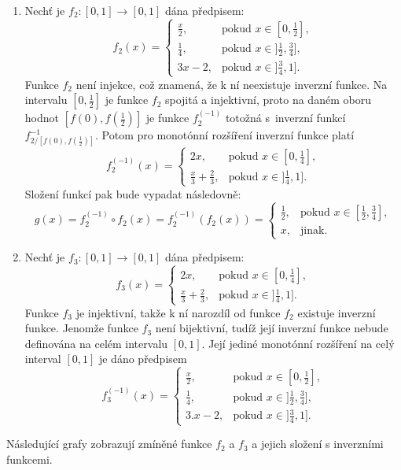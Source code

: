 \begin{example}
\label{sec: funkce}
\cite{hlinena}
\begin{enumerate}
    \item Nech\v t je $f_2:[0,1] \rightarrow [0,1]$ dána předpisem:
    $$f_2(x)= \begin{cases} \frac x2, & \mbox{pokud~} x \in [0,\frac 12],
    \\ \frac 14, & \mbox{pokud~} x \in ]\frac 12,\frac 34],
    \\ 3x-2, & \mbox{pokud~} x \in ]\frac 34,1].
    \end{cases}$$
    Funkce $f_2$ není injekce, což znamená, že k ní neexistuje inverzní funkce. Na intervalu $[0,\frac 12]$ je funkce $f_2$ spojitá a injektivní, proto na daném oboru hodnot $[f(0),f(\frac 12)]$ je
    funkce $f_2^{(-1)}$ totožná s~inverzní funkcí
    $f_{2/[f(0),f(\frac 12)]}^{-1}.$
    Potom pro monot\'onní rozšíření inverzní funkce plat\'i
    $$f_2^{(-1)}(x)= \begin{cases} 2x, & \mbox {pokud $x \in [0,\frac 14],$}
    \\ \frac x3 + \frac 23, & \mbox {pokud $x \in ]\frac 14,1].$}
    \end{cases}$$
    Složení funkcí pak bude vypadat následovně:
    $$g(x)=f_2^{(-1)} \circ f_2(x)=f_2^{(-1)} \left(f_2(x)\right)= \begin{cases} \frac 12,
    & \mbox{pokud $x \in [\frac 12,\frac 34],$}
    \\x, & \mbox {jinak.} \end{cases}$$
    
    \item Nech\v t je $f_3:[0,1] \rightarrow [0,1]$ dána předpisem:
    $$f_3(x)= \begin{cases} 2x, & \mbox {pokud $x \in [0,\frac 14],$}
    \\ \frac x3 + \frac 23, & \mbox {pokud $x \in ]\frac 14,1].$}
    \end{cases}$$
    Funkce $f_3$ je injektivní, takže k ní narozdíl od funkce $f_2$ existuje inverzní funkce. Jenomže funkce $f_3$ není bijektivní, tudíž její inverzní funkce nebude definována na celém intervalu $[0,1]$. 
    Její jediné monot\' onní rozšíření na celý interval $[0,1]$ je dáno předpisem
    $$f_3^{(-1)}(x)= \begin{cases} \frac x2, & \mbox {pokud $x \in [0,\frac 12],$}
    \\ \frac 14, & \mbox {pokud $x \in ]\frac 12,\frac 34],$}
    \\ 3.x-2, & \mbox {pokud $x \in ]\frac 34,1]$.}
    \end{cases}$$
\end{enumerate}
\end{example}
Následující grafy zobrazují zmíněné funkce $f_2$ a $f_3$ a jejich složení s inverzními funkcemi.\\

